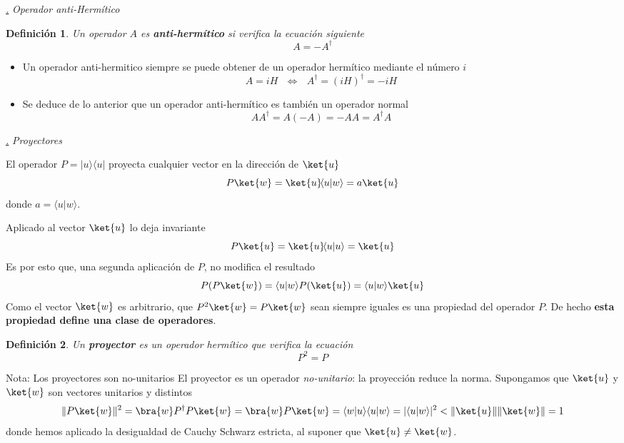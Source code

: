 \documentclass[a4paper,11pt]{book} %
\newtheorem{definicion_contador}{Definición}
\newcommand{\Definicion}[1]{
		\begin{mybox_gray2}{}
			\begin{definicion_contador}
				 #1 
			\end{definicion_contador} 
		\end{mybox_gray2}
	}
\numberwithin{equation}{chapter}
\newcommand{\braket}[2]{\langle #1|#2\rangle}
\newcommand{\ketbra}[2]{| #1\rangle \! \langle #2|}
\def\subsubiContadorIt{\par\addtocounter{subsubsection}{1}\underline{\it\thesubsubsection.}\hskip0.5cm \setcounter{subsubsubsectionIt}{0}}
\newcommand{\SubsubiIt}[1]{
		\subsubiContadorIt \textit{#1}
	}
\newcounter{subsubsubsectionIt}[subsubsection]
\begin{document}
			\SubsubiIt{Operador anti-Hermítico}

\Definicion{
Un operador  $A$ es \textbf{anti-hermítico} si  verifica la ecuación siguiente
	\begin{equation}
	A = -A^\dagger
	\end{equation}
}
\begin{itemize}
	\item Un operador anti-hermitico siempre se puede obtener de un operador hermítico mediante el número $i$
	\begin{equation}
	A = i H ~~~\Longleftrightarrow ~~~A^\dagger = (i H)^\dagger = -i H
	\end{equation}
	\item Se deduce de lo anterior que un operador anti-hermítico es también un operador normal
	\begin{equation}
	A A^\dagger = A (-A) = -A A = A^\dagger A
	\end{equation}

\end{itemize}


			\SubsubiIt{Proyectores}


	El operador $P = \ketbra{u}{u}$ proyecta cualquier vector en la dirección de $\ket{u}$
	\begin{equation}
	P \ket{w} = \ket{u}\!\braket{u}{w} = a \ket{u}
	\end{equation}
donde $a = \braket{u}{w}$.

Aplicado al vector $\ket{u}$ lo deja invariante
	\begin{equation}
	P \ket{u} = \ket{u}\!\braket{u}{u} =  \ket{u}
	\end{equation}
Es por esto que, una segunda aplicación de $P$, no modifica el resultado
\begin{equation}
P(P \ket{w}) =  \braket{u}{w} P(\ket{u}) = \braket{u}{w} \ket{u}
\end{equation}
Como el vector $\ket{w}$ es arbitrario, que $P^2\ket{w} = P\ket{w}$ sean siempre iguales es una propiedad del operador $P$. De hecho \textbf{esta propiedad define una clase de operadores}. 

	\Definicion{
	Un \textbf{proyector }es un operador hermítico que verifica la ecuación
\begin{equation}
P^2 = P
\end{equation}
	}

\begin{mybox_blue}{Nota: Los proyectores son no-unitarios}
El proyector es un operador \textit{no-unitario}: la proyección reduce la norma.
Supongamos que $\ket{u}$ y $\ket{w}$ son vectores unitarios y distintos
	\begin{equation}
	\| P\ket{w}\|^2 = \bra{w}P^\dagger P\ket{w} = \bra{w} P\ket{w}= \braket{w}{u}\braket{u}{w} = |\braket{u}{w}|^2 < \|\ket{u}\|\|\ket{w}\| = 1  
	\end{equation}
donde hemos aplicado la desigualdad de Cauchy Schwarz estricta, al suponer que $\ket{u}\neq\ket{w}$.
\end{mybox_blue}
\end{document}
